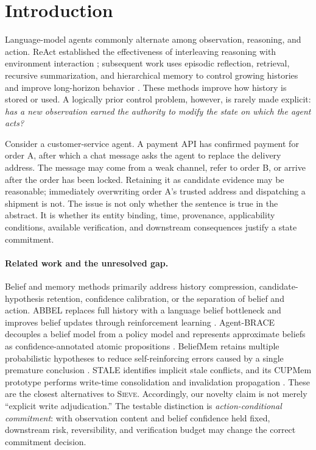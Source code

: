 \documentclass{article}
\newcommand{\method}{\textsc{Sieve}}
\begin{document}
\section{Introduction}
\label{sec:introduction}

Language-model agents commonly alternate among observation, reasoning, and action. ReAct established the effectiveness of interleaving reasoning with environment interaction \citep{yao2023react}; subsequent work uses episodic reflection, retrieval, recursive summarization, and hierarchical memory to control growing histories and improve long-horizon behavior \citep{shinn2023reflexion,park2023generative,packer2023memgpt}. These methods improve how history is stored or used. A logically prior control problem, however, is rarely made explicit: \emph{has a new observation earned the authority to modify the state on which the agent acts?}

Consider a customer-service agent. A payment API has confirmed payment for order A, after which a chat message asks the agent to replace the delivery address. The message may come from a weak channel, refer to order B, or arrive after the order has been locked. Retaining it as candidate evidence may be reasonable; immediately overwriting order A's trusted address and dispatching a shipment is not. The issue is not only whether the sentence is true in the abstract. It is whether its entity binding, time, provenance, applicability conditions, available verification, and downstream consequences justify a state commitment.

\paragraph{Related work and the unresolved gap.}
Belief and memory methods primarily address history compression, candidate-hypothesis retention, confidence calibration, or the separation of belief and action. ABBEL replaces full history with a language belief bottleneck and improves belief updates through reinforcement learning \citep{lidayan2025abbel}. Agent-BRACE decouples a belief model from a policy model and represents approximate beliefs as confidence-annotated atomic propositions \citep{singh2026agentbrace}. BeliefMem retains multiple probabilistic hypotheses to reduce self-reinforcing errors caused by a single premature conclusion \citep{liao2026beliefmem}. STALE identifies implicit stale conflicts, and its CUPMem prototype performs write-time consolidation and invalidation propagation \citep{chao2026stale}. These are the closest alternatives to \method. Accordingly, our novelty claim is not merely ``explicit write adjudication.'' The testable distinction is \emph{action-conditional commitment}: with observation content and belief confidence held fixed, downstream risk, reversibility, and verification budget may change the correct commitment decision.
\end{document}
